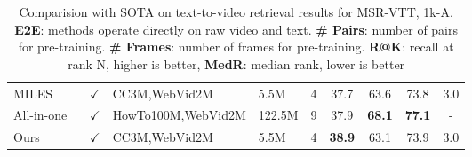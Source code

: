 \documentclass[10pt,twocolumn,letterpaper]{article}
\begin{document}
\begin{table*}[]
\begin{tabular}{ll|lll|cccc}
        MILES ~\cite{miles}       & $\checkmark$ & CC3M,WebVid2M       & 5.5M  &  4   & 37.7 & 63.6                     & 73.8    & 3.0                 \\
        All-in-one ~\cite{all-in-one}  & $\checkmark$ & HowTo100M,WebVid2M   & 122.5M  & 9 & 37.9 & \textbf{68.1}                     & \textbf{77.1}   & -                 \\
        \cellcolor{mygray-bg}Ours         & \cellcolor{mygray-bg}$\checkmark$ &\cellcolor{mygray-bg}CC3M,WebVid2M        &\cellcolor{mygray-bg}5.5M    &\cellcolor{mygray-bg}4   &\cellcolor{mygray-bg}\textbf{38.9} &\cellcolor{mygray-bg}63.1 &\cellcolor{mygray-bg}73.9 &\cellcolor{mygray-bg}3.0 \\ \bottomrule
        \end{tabular}\vspace{-2mm}
        
        \caption{Comparision with SOTA on text-to-video retrieval results for MSR-VTT, 1k-A. \textbf{E2E}: methods operate directly on raw video and text. \textbf{\# Pairs}: number of pairs for pre-training. \textbf{\# Frames}: number of frames for pre-training. \textbf{R@K}: recall at rank N, higher is better, \textbf{MedR}: median rank, lower is better}
        \label{tab:MSRVTT}
        \end{table*}
\end{document}
